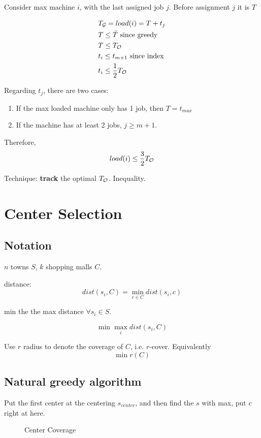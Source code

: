 \documentclass[a4paper]{report}
\theoremstyle{definition}
\begin{document}
Consider max machine $i$, with the last assigned job $j$. Before assignment $j$ it is $T$

\begin{align*}
& T_{\mathcal{G}}=load(i) = T+t_j\\
& T \leq \bar T \text{ since greedy}\\
& T \leq T_{\mathcal{O}} \\
& t_i \leq t_{m+1} \text{ since index} \\
& t_i \leq \frac{1}{2}T_{\mathcal{O}}
\end{align*}

Regarding $t_j$, there are two cases:
\begin{enumerate}
\item If the max loaded machine only has 1 job, then $T = t_{max}$ 
\item If the machine has at least 2 jobs, $j\geq m+1$.
\end{enumerate}

Therefore, 
$$load(i)\leq \frac{3}{2} T_{\mathcal{O}}$$

Technique: \textbf{track} the optimal $T_{\mathcal{O}}$. Inequality. 

\section{Center Selection}
\subsection{Notation}
$n$ towns $S$, $k$ shopping malls $C$. 

distance:
$$
dist(s_i, C) =\min_{c\in C} dist(s_i, c)
$$

min the the max distance $\forall s_i \in S$.

$$
\min \max_i dist(s_i, C)
$$

Use $r$ radius to denote the coverage of $C$, i.e. $r$-cover. Equivalently 
$$
\min r(C)
$$
\subsection{Natural greedy algorithm}
Put the first center at the centering $s_{center}$, and then find the $s$ with max, put $c$ right at here. 

\begin{figure}[!htp]
\centering
{}
\caption{Center Coverage}
\label{fig:11_4}
\end{figure}
\end{document}
